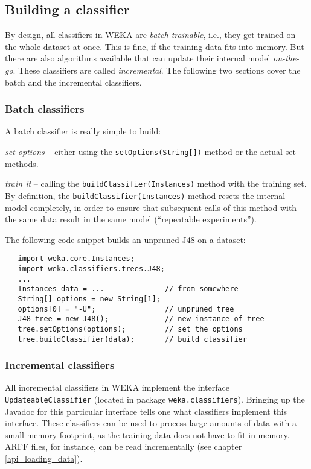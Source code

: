 \subsection{Building a classifier}
By design, all classifiers in WEKA are \textit{batch-trainable}, i.e., they get
trained on the whole dataset at once. This is fine, if the training data fits
into memory. But there are also algorithms available that can update their
internal model \textit{on-the-go}. These classifiers are called
\textit{incremental}. The following two sections cover the batch and the
incremental classifiers.

\subsubsection*{Batch classifiers}
A batch classifier is really simple to build:
\begin{tight_itemize}
	\item \textit{set options} -- either using the \texttt{setOptions(String[])}
method or the actual set-methods.
	\item \textit{train it} -- calling the \texttt{buildClassifier(Instances)}
method with the training set. By definition, the
\texttt{buildClassifier(Instances)} method resets the internal model completely,
in order to ensure that subsequent calls of this method with the same data
result in the same model (``repeatable experiments'').
\end{tight_itemize}
The following code snippet builds an unpruned J48 on a dataset:
\begin{verbatim}
   import weka.core.Instances;
   import weka.classifiers.trees.J48;
   ...
   Instances data = ...              // from somewhere
   String[] options = new String[1];
   options[0] = "-U";                // unpruned tree
   J48 tree = new J48();             // new instance of tree
   tree.setOptions(options);         // set the options
   tree.buildClassifier(data);       // build classifier
\end{verbatim}

\subsubsection*{Incremental classifiers}
All incremental classifiers in WEKA implement the interface
\texttt{UpdateableClassifier} (located in package \texttt{weka.classifiers}).
Bringing up the Javadoc for this particular interface tells one what classifiers
implement this interface. These classifiers can be used to process large amounts
of data with a small memory-footprint, as the training data does not have to fit
in memory. ARFF files, for instance, can be read incrementally (see chapter
\ref{api_loading_data}).

